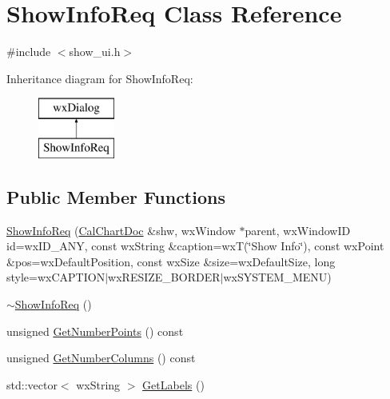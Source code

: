 \hypertarget{a00138}{\section{Show\-Info\-Req Class Reference}
\label{a00138}
}


{\ttfamily \#include $<$show\-\_\-ui.\-h$>$}

Inheritance diagram for Show\-Info\-Req\-:\begin{figure}[H]
\begin{center}
\leavevmode
\includegraphics[height=2.000000cm]{a00138}
\end{center}
\end{figure}
\subsection*{Public Member Functions}
\begin{DoxyCompactItemize}
\item 
\hyperlink{a00138_ac3f6bbf4ace6cb7e378dcc7edb83e49a}{Show\-Info\-Req} (\hyperlink{a00020}{Cal\-Chart\-Doc} \&shw, wx\-Window $\ast$parent, wx\-Window\-I\-D id=wx\-I\-D\-\_\-\-A\-N\-Y, const wx\-String \&caption=wx\-T(\char`\"{}Show Info\char`\"{}), const wx\-Point \&pos=wx\-Default\-Position, const wx\-Size \&size=wx\-Default\-Size, long style=wx\-C\-A\-P\-T\-I\-O\-N$\vert$wx\-R\-E\-S\-I\-Z\-E\-\_\-\-B\-O\-R\-D\-E\-R$\vert$wx\-S\-Y\-S\-T\-E\-M\-\_\-\-M\-E\-N\-U)
\item 
\hyperlink{a00138_a1bf0e7f7edb1070d3918a58b840569a1}{$\sim$\-Show\-Info\-Req} ()
\item 
unsigned \hyperlink{a00138_a7cd1bfc68e492fd9664b5fb60a6803b0}{Get\-Number\-Points} () const 
\item 
unsigned \hyperlink{a00138_a136065fa6f9c11b71cb3ab9a6373bb1f}{Get\-Number\-Columns} () const 
\item 
std\-::vector$<$ wx\-String $>$ \hyperlink{a00138_ac438a5f34e36a80d36decd62702d7d78}{Get\-Labels} ()
\end{DoxyCompactItemize}
